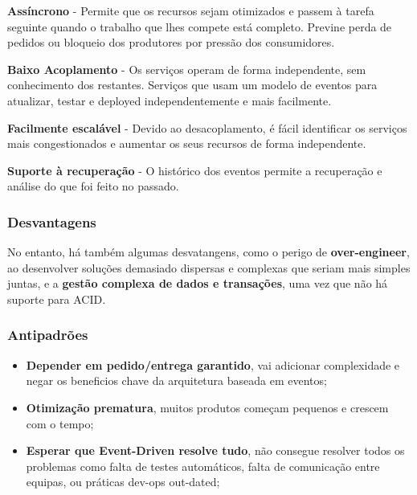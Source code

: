 \documentclass{article}
\begin{document}
\begin{flushleft}
  \textbf{Assíncrono} - Permite que os recursos sejam otimizados e passem à tarefa seguinte quando o trabalho que
  lhes compete está completo. Previne perda de pedidos ou bloqueio dos produtores por pressão dos
  consumidores.

  \vspace{1mm}

  \textbf{Baixo Acoplamento} - Os serviços operam de forma independente, sem conhecimento dos restantes.
  Serviços que usam um modelo de eventos para atualizar, testar e
  deployed independentemente e mais facilmente.

  \vspace{1mm}

  \textbf{Facilmente escalável} - Devido ao desacoplamento, é fácil identificar os serviços mais congestionados e
  aumentar os seus recursos de forma independente.

  \vspace{1mm}

  \textbf{Suporte à recuperação} - O histórico dos eventos permite a recuperação e análise do que foi feito no
  passado.
\end{flushleft}

\subsubsection{Desvantagens}

No entanto, há também algumas desvatangens, como o perigo de \textbf{over-engineer}, ao
desenvolver soluções demasiado dispersas e complexas que seriam mais simples juntas, e a
\textbf{gestão complexa de dados e transações}, uma vez que não há suporte para ACID.

\subsubsection{Antipadrões}

\begin{itemize}
  \item \textbf{Depender em pedido/entrega garantido},
  vai adicionar complexidade e negar os beneficios chave da
  arquitetura baseada em eventos;
  \item \textbf{Otimização prematura}, muitos produtos começam pequenos
  e crescem com o tempo;
  \item \textbf{Esperar que Event-Driven resolve tudo},
  não consegue resolver todos os problemas como falta de
  testes automáticos, falta de comunicação entre equipas,
  ou práticas dev-ops out-dated;
\end{itemize}
\end{document}
